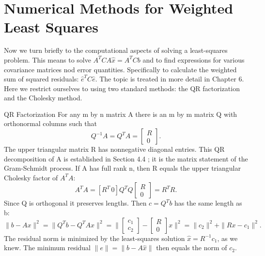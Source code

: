\section{Numerical Methods for Weighted Least Squares}
Now we turn briefly to the computational aspects of solving a least-squares problem. This
means to solve $A^TCA\hat{x}=A^TCb$ and to find expressions for various covariance matrices
nod error quantities. Specifically to calculate the weighted sum of squared residuals: $\hat{e}^TC\hat{e}$. The topic is treated in more detail in Chapter 6. Here we restrict ourselves to using two standard methods: the QR factorization and the Cholesky method.

QR Factorization For any m by n matrix A there is an m by m matrix Q with orthonormal
columns such that
\begin{equation}
Q^{-1}A=Q^TA=\begin{bmatrix} R\\0 \end{bmatrix}.
\end{equation}
The upper triangular matrix R has nonnegative diagonal entries. This QR decomposition
of A is established in Section 4.4 ; it is the matrix statement of the Gram-Schmidt process.
If A has full rank n, then R equals the upper triangular Cholesky factor of $A^TA$:
\begin{equation*}
A^TA=[R^T\, 0]Q^TQ
\begin{bmatrix} R\\0 \end{bmatrix}
=R^TR.
\end{equation*}
Since Q is orthogonal it preserves lengths. Then $c=Q^Tb$ has the same length as b:
\begin{equation}
\|b-Ax\|^2=\|Q^Tb-Q^TAx\|^2=\|\begin{bmatrix}c_1 \\ c_2\end{bmatrix}-\begin{bmatrix}
R\\0 \end{bmatrix}x\|^2=\|c_2\|^2+\|Rx-c_1\|^2.
\end{equation} 
The residual norm is minimized by the least-squares solution $\hat{x}=R^{-1}c_1$, as we knew. The
minimum residual $\|e\|=\|b-A\hat{x}\|$ then equals the norm of $c_2$.

